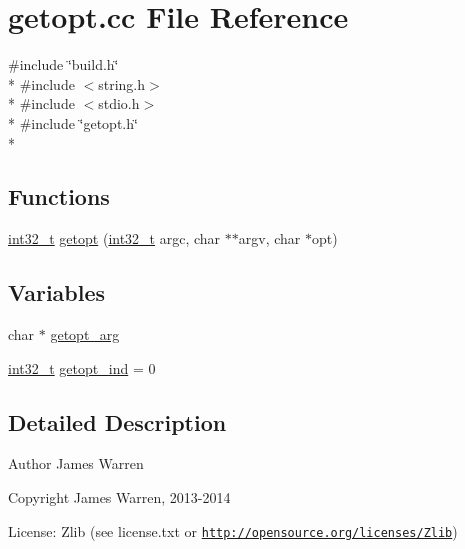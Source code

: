 \section{getopt.\-cc File Reference}
\label{getopt_8cc}
{\ttfamily \#include \char`\"{}build.\-h\char`\"{}}\\*
{\ttfamily \#include $<$string.\-h$>$}\\*
{\ttfamily \#include $<$stdio.\-h$>$}\\*
{\ttfamily \#include \char`\"{}getopt.\-h\char`\"{}}\\*
\subsection*{Functions}
\begin{DoxyCompactItemize}
\item 
\hyperlink{stdint_8h_a32f2e37ee053cf2ce8ca28d1f74630e5}{int32\-\_\-t} \hyperlink{getopt_8cc_a17d46866b2fe080e431fc418fb0a2856}{getopt} (\hyperlink{stdint_8h_a32f2e37ee053cf2ce8ca28d1f74630e5}{int32\-\_\-t} argc, char $\ast$$\ast$argv, char $\ast$opt)
\end{DoxyCompactItemize}
\subsection*{Variables}
\begin{DoxyCompactItemize}
\item 
char $\ast$ \hyperlink{getopt_8cc_a84940a9c99ac9a62c8053ea9a813d701}{getopt\-\_\-arg}
\item 
\hyperlink{stdint_8h_a32f2e37ee053cf2ce8ca28d1f74630e5}{int32\-\_\-t} \hyperlink{getopt_8cc_abda8f035f8a0a81f898a7c10eaca6903}{getopt\-\_\-ind} = 0
\end{DoxyCompactItemize}


\subsection{Detailed Description}
\begin{DoxyAuthor}{Author}
James Warren 
\end{DoxyAuthor}
\begin{DoxyCopyright}{Copyright}
James Warren, 2013-\/2014 
\end{DoxyCopyright}
\begin{DoxyParagraph}{License\-:}
Zlib (see license.\-txt or \href{http://opensource.org/licenses/Zlib}{\tt http\-://opensource.\-org/licenses/\-Zlib}) 
\end{DoxyParagraph}


